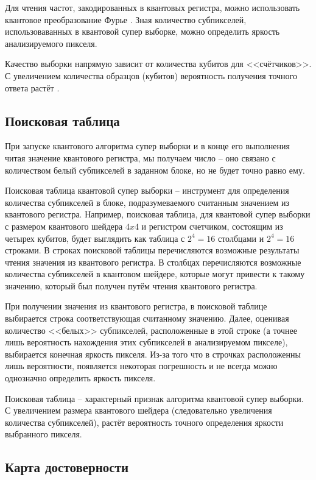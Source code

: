 Для чтения частот, закодированных в квантовых регистра, можно использовать квантовое преобразование Фурье \cite{PQC}. Зная количество субпикселей, использоваванных в квантовой супер выборке, можно определить яркость анализируемого пикселя.

Качество выборки напрямую зависит от количества кубитов для <<счётчиков>>. С увеличением количества образцов (кубитов) вероятность получения точного ответа растёт \cite{PQC}.

\subsection{Поисковая таблица}

При запуске квантового алгоритма супер выборки и в конце его выполнения читая значение квантового регистра, мы получаем число -- оно связано с количеством белый субпикселей в заданном блоке, но не будет точно равно ему. 

Поисковая таблица квантовой супер выборки -- инструмент для определения количества субпикселей в блоке, подразумеваемого считанным значением из квантового регистра. Например, поисковая таблица, для квантовой супер выборки с размером квантового шейдера $4x4$ и регистром счетчиком, состоящим из четырех кубитов, будет выглядить как таблица с $2^4 = 16$ столбцами и $2^4 = 16$ строками. В строках поисковой таблицы перечисляются возможные результаты чтения значения из квантового регистра. В столбцах перечисляются возможные количества  субпикселей в квантовом шейдере, которые могут привести к такому значению, который был получен путём чтения квантового регистра.

При получении значения из квантового регистра, в поисковой таблице выбирается строка соответствующая считанному значению. Далее, оценивая количество <<белых>> субпикселей, расположенные в этой строке (а точнее лишь вероятность нахождения этих субпикселей в анализируемом пикселе), выбирается конечная яркость пикселя. Из-за того что в строчках расположенны лишь вероятности, появляется некоторая погрешность и не всегда можно  однозначно определить яркость пикселя.

Поисковая таблица -- характерный признак алгоритма квантовой супер выборки. С увеличением размера квантового шейдера (следовательно увеличения количества субпикселей), растёт вероятность точного определения яркости выбранного пикселя.

\subsection{Карта достоверности}

